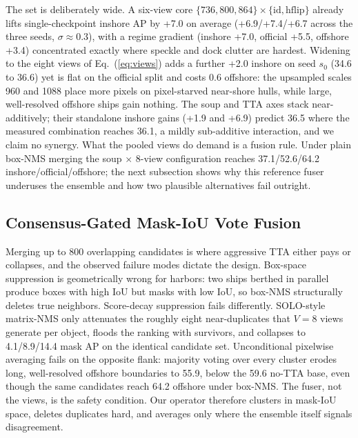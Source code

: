 The set is deliberately wide. A six-view core $\{736,800,864\}\times\{\mathrm{id},\mathrm{hflip}\}$ already lifts single-checkpoint inshore AP by +7.0 on average (+6.9/+7.4/+6.7 across the three seeds, $\sigma\approx 0.3$), with a regime gradient (inshore +7.0, official +5.5, offshore +3.4) concentrated exactly where speckle and dock clutter are hardest. Widening to the eight views of Eq.~(\ref{eq:views}) adds a further +2.0 inshore on seed $s_0$ (34.6 to 36.6) yet is flat on the official split and costs 0.6 offshore: the upsampled scales 960 and 1088 place more pixels on pixel-starved near-shore hulls, while large, well-resolved offshore ships gain nothing. The soup and TTA axes stack near-additively; their standalone inshore gains (+1.9 and +6.9) predict 36.5 where the measured combination reaches 36.1, a mildly sub-additive interaction, and we claim no synergy. What the pooled views do demand is a fusion rule. Under plain box-NMS merging the soup $\times$ 8-view configuration reaches 37.1/52.6/64.2 inshore/official/offshore; the next subsection shows why this reference fuser underuses the ensemble and how two plausible alternatives fail outright.

\subsection{Consensus-Gated Mask-IoU Vote Fusion}\label{sec:fusion}

Merging up to 800 overlapping candidates is where aggressive TTA either pays or collapses, and the observed failure modes dictate the design. Box-space suppression is geometrically wrong for harbors: two ships berthed in parallel produce boxes with high IoU but masks with low IoU, so box-NMS structurally deletes true neighbors. Score-decay suppression fails differently. SOLO-style matrix-NMS only attenuates the roughly eight near-duplicates that $V=8$ views generate per object, floods the ranking with survivors, and collapses to 4.1/8.9/14.4 mask AP on the identical candidate set. Unconditional pixelwise averaging fails on the opposite flank: majority voting over every cluster erodes long, well-resolved offshore boundaries to 55.9, below the 59.6 no-TTA base, even though the same candidates reach 64.2 offshore under box-NMS. The fuser, not the views, is the safety condition. Our operator therefore clusters in mask-IoU space, deletes duplicates hard, and averages only where the ensemble itself signals disagreement.

